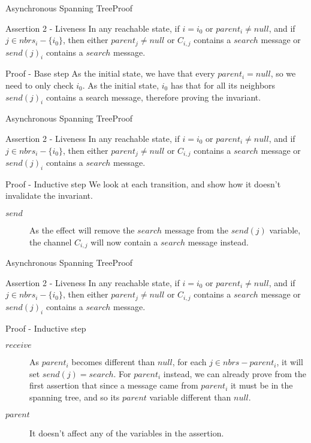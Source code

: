 \documentclass[pdf]{beamer}
\begin{document}
\begin{frame}[plain]{Asynchronous Spanning Tree}{Proof}
    \begin{block}{Assertion 2 - Liveness}
        In any reachable state, if $i=i_0$ or $parent_i \neq null$, and if $j \in nbrs_i - \{i_0\}$,
        then either $parent_j \neq null$ or $C_{i,j}$ contains a $search$ message or $send(j)_i$ contains a $search$ message.
    \end{block}	
    \begin{block}{Proof - Base step}
    As the initial state, we have that every $parent_i = null$, so we need to only check $i_0$.
    As the initial state, $i_0$ has that for all its neighbors $send(j)_i$ contains a search message,
    therefore proving the invariant.
    \end{block}
\end{frame}
\begin{frame}[plain]{Asynchronous Spanning Tree}{Proof}
    \begin{block}{Assertion 2 - Liveness}
        In any reachable state, if $i=i_0$ or $parent_i \neq null$, and if $j \in nbrs_i - \{i_0\}$,
        then either $parent_j \neq null$ or $C_{i,j}$ contains a $search$ message or $send(j)_i$ contains a $search$ message.
    \end{block}	
    \begin{block}{Proof - Inductive step}
    We look at each transition, and show how it doesn't invalidate the invariant.
    \begin{description}
    \item[$send$]{As the effect will remove the $search$ message from the $send(j)$ variable, the channel $C_{i,j}$ will now contain a $search$ message instead.}
    \end{description}
    \end{block}
\end{frame}
\begin{frame}[plain]{Asynchronous Spanning Tree}{Proof}
    \begin{block}{Assertion 2 - Liveness}
        In any reachable state, if $i=i_0$ or $parent_i \neq null$, and if $j \in nbrs_i - \{i_0\}$,
        then either $parent_j \neq null$ or $C_{i,j}$ contains a $search$ message or $send(j)_i$ contains a $search$ message.
    \end{block}	
    \begin{block}{Proof - Inductive step}
    \begin{description}
    \item[$receive$]{As $parent_i$ becomes different than $null$, for each $j \in nbrs - {parent_i}$,
    it will set $send(j) = search$. For $parent_i$ instead, we can already prove from the first assertion that since a message came from $parent_i$ it must be in the spanning tree, and so its $parent$ variable different than $null$.}
    \item[$parent$]{It doesn't affect any of the variables in the assertion.}
    \end{description}
    \end{block}
\end{frame}
\end{document}
